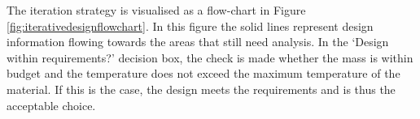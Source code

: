 The iteration strategy is visualised as a flow-chart in Figure \ref{fig:iterativedesignflowchart}. In this figure the solid lines represent design information flowing towards the areas that still need analysis. In the `Design within requirements?' decision box, the check is made whether the mass is within budget and the temperature does not exceed the maximum temperature of the material. If this is the case, the design meets the requirements and is thus the acceptable choice.


